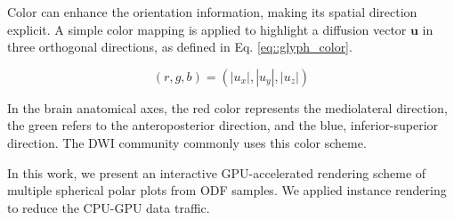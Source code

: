 \documentclass[twoside,twocolumn,10pt]{article}
\begin{document}

Color can enhance the orientation information, making its spatial direction explicit. A simple color mapping is applied to highlight a diffusion vector $\bm{u}$ in three orthogonal directions, as defined in Eq. \ref{eq::glyph_color}.

\begin{equation}
\label{eq::glyph_color}
    (r,g,b) = (|u_x|,|u_y|,|u_z|)
\end{equation}

In the brain anatomical axes, the red color represents the mediolateral direction, the green refers to the anteroposterior direction, and the blue, inferior-superior direction. The DWI community commonly uses this color scheme.


In this work, we present an interactive GPU-accelerated rendering scheme of multiple spherical polar plots from ODF samples. We applied instance rendering to reduce the CPU-GPU data traffic.%

\end{document}
